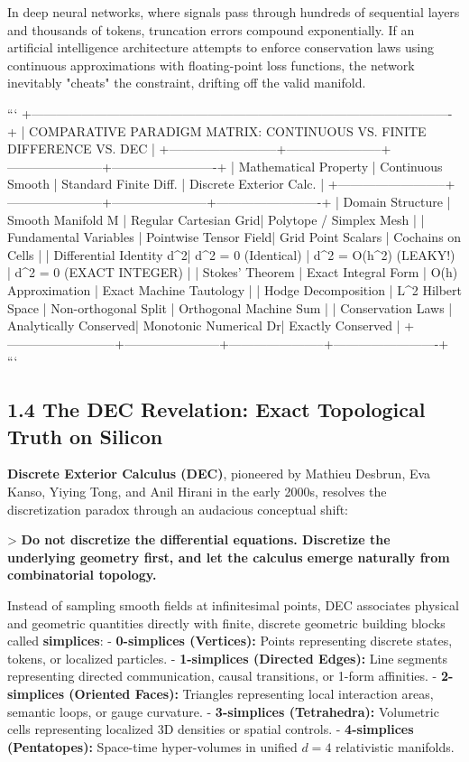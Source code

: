 \documentclass[11pt,twoside,openright]{amsbook}
\begin{document}
In deep neural networks, where signals pass through hundreds of sequential layers and thousands of tokens, truncation errors compound exponentially. If an artificial intelligence architecture attempts to enforce conservation laws using continuous approximations with floating-point loss functions, the network inevitably "cheats" the constraint, drifting off the valid manifold.

```
+----------------------------------------------------------------------------------------------------+
| COMPARATIVE PARADIGM MATRIX: CONTINUOUS VS. FINITE DIFFERENCE VS. DEC                             |
+--------------------------+-----------------------+-----------------------+-------------------------+
| Mathematical Property    | Continuous Smooth     | Standard Finite Diff. | Discrete Exterior Calc. |
+--------------------------+-----------------------+-----------------------+-------------------------+
| Domain Structure         | Smooth Manifold M     | Regular Cartesian Grid| Polytope / Simplex Mesh |
| Fundamental Variables    | Pointwise Tensor Field| Grid Point Scalars    | Cochains on Cells       |
| Differential Identity d^2| d^2 = 0 (Identical)   | d^2 = O(h^2) (LEAKY!) | d^2 = 0 (EXACT INTEGER) |
| Stokes' Theorem          | Exact Integral Form   | O(h) Approximation    | Exact Machine Tautology |
| Hodge Decomposition      | L^2 Hilbert Space     | Non-orthogonal Split  | Orthogonal Machine Sum  |
| Conservation Laws        | Analytically Conserved| Monotonic Numerical Dr| Exactly Conserved       |
+--------------------------+-----------------------+-----------------------+-------------------------+
```

\subsection{1.4 The DEC Revelation: Exact Topological Truth on Silicon}

\textbf{Discrete Exterior Calculus (DEC)}, pioneered by Mathieu Desbrun, Eva Kanso, Yiying Tong, and Anil Hirani in the early 2000s, resolves the discretization paradox through an audacious conceptual shift:

> \textbf{Do not discretize the differential equations. Discretize the underlying geometry first, and let the calculus emerge naturally from combinatorial topology.}

Instead of sampling smooth fields at infinitesimal points, DEC associates physical and geometric quantities directly with finite, discrete geometric building blocks called \textbf{simplices}:
- \textbf{0-simplices (Vertices):} Points representing discrete states, tokens, or localized particles.
- \textbf{1-simplices (Directed Edges):} Line segments representing directed communication, causal transitions, or 1-form affinities.
- \textbf{2-simplices (Oriented Faces):} Triangles representing local interaction areas, semantic loops, or gauge curvature.
- \textbf{3-simplices (Tetrahedra):} Volumetric cells representing localized 3D densities or spatial controls.
- \textbf{4-simplices (Pentatopes):} Space-time hyper-volumes in unified $d=4$ relativistic manifolds.
\end{document}
